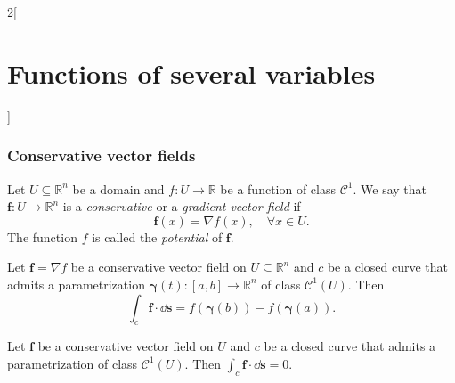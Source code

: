 \documentclass[../../../main.tex]{subfiles}
\begin{document}
\begin{multicols}{2}[\section{Functions of several variables}]
\subsubsection*{Conservative vector fields}
\begin{definition}
Let $U\subseteq\mathbb{R}^n$ be a domain and $f:U\rightarrow\mathbb{R}$ be a function of class $\mathcal{C}^1$. We say that $\boldsymbol{f}:U\rightarrow\mathbb{R}^n$ is a \textit{conservative} or a \textit{gradient vector field} if $$\boldsymbol{f}(x)=\nabla f(x),\quad \forall x\in U.$$ The function $f$ is called the \textit{potential} of $\boldsymbol{f}$.
\end{definition}
\begin{theorem}
Let $\boldsymbol{f}=\nabla f$ be a conservative vector field on $U\subseteq\mathbb{R}^n$ and $c$ be a closed curve that admits a parametrization $\boldsymbol{\gamma}(t):[a,b]\rightarrow\mathbb{R}^n$ of class $\mathcal{C}^1(U)$. Then $$\int_c\boldsymbol{f}\cdot \dd \textbf{s}=f(\boldsymbol{\gamma}(b))-f(\boldsymbol{\gamma}(a)).$$
\end{theorem}
\begin{corollary}
Let $\boldsymbol{f}$ be a conservative vector field on $U$ and $c$ be a closed curve that admits a parametrization of class $\mathcal{C}^1(U)$. Then $\displaystyle\int_c\boldsymbol{f}\cdot \dd \textbf{s}=0$.
\end{corollary}

\end{multicols}
\end{document}
